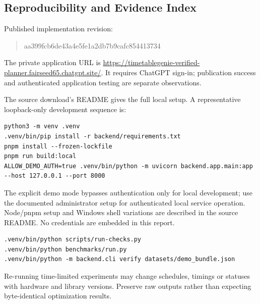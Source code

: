 \documentclass[pdflatex,sn-mathphys-num]{sn-jnl}
\theoremstyle{thmstyleone}
\theoremstyle{thmstyletwo}
\theoremstyle{thmstylethree}
\begin{document}
\begin{appendices}
\section{Reproducibility and Evidence Index}\label{app:repro}

Published implementation revision:
\begin{quote}\small\ttfamily
aa399fcb6de43a4e5fe1a2db7b9cafc854413734
\end{quote}
The private application URL is
\url{https://timetablegenie-verified-planner.fairseed65.chatgpt.site/}.
It requires ChatGPT sign-in; publication success and authenticated application testing are separate observations.

The source download's README gives the full local setup. A representative loopback-only development sequence is:
\noindent\begin{minipage}{\linewidth}
\begin{lstlisting}[basicstyle=\ttfamily\scriptsize,breaklines=true,frame=single]
python3 -m venv .venv
.venv/bin/pip install -r backend/requirements.txt
pnpm install --frozen-lockfile
pnpm run build:local
ALLOW_DEMO_AUTH=true .venv/bin/python -m uvicorn backend.app.main:app --host 127.0.0.1 --port 8000
\end{lstlisting}
\end{minipage}\par\medskip
The explicit demo mode bypasses authentication only for local development; use the documented administrator setup for authenticated local service operation. Node/pnpm setup and Windows shell variations are described in the source README. No credentials are embedded in this report.

\noindent\begin{minipage}{\linewidth}
\begin{lstlisting}[basicstyle=\ttfamily\scriptsize,breaklines=true,frame=single]
.venv/bin/python scripts/run-checks.py
.venv/bin/python benchmarks/run.py
.venv/bin/python -m backend.cli verify datasets/demo_bundle.json
\end{lstlisting}
\end{minipage}\par\medskip
Re-running time-limited experiments may change schedules, timings or statuses with hardware and library versions. Preserve raw outputs rather than expecting byte-identical optimization results.


\end{appendices}
\end{document}
